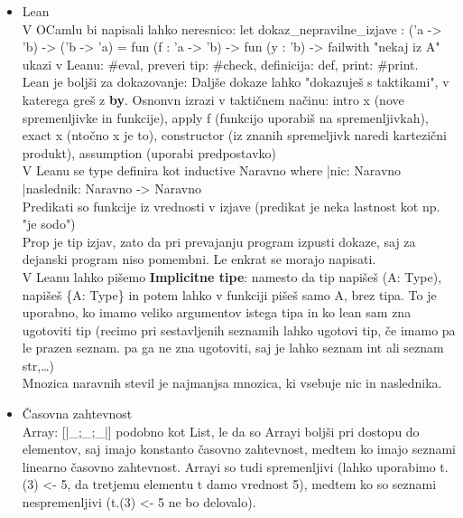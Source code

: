 \documentclass[a4paper]{article}
\begin{document}
\begin{itemize}
        Konstruktorji: nacini, kako lahko ustvarimo vrednosti danega tipa, recimo naravna stevila imajo 2 konstruktorja: Nic in Naslednik\\
        Pametni konstruktorji pa vzamejo podatke, preverijo, če so v redu in nato konstruirajo neko vrednost.\\
        failwith "Opis napake" namerno sesuje funkcijo. Uporabljamo, zato da vmo, kje je napaka v nasi kodi. Njegov tip je poljuben ('a)
        \item Lean\\
        V OCamlu bi napisali lahko neresnico: let dokaz\_nepravilne\_izjave : ('a -> 'b) -> ('b -> 'a) =
        fun (f : 'a -> 'b) -> fun (y : 'b) -> failwith "nekaj iz A"\\
        ukazi v Leanu: \#eval, preveri tip: \#check, definicija: def, print: \#print.\\
        Lean je boljši za dokazovanje: Daljše dokaze lahko "dokazuješ s taktikami", v katerega greš z \textbf{by}. Osnonvn izrazi v taktičnem načinu: intro x (nove spremenljivke in funkcije), apply f (funkcijo uporabiš na spremenljivkah), exact x (ntočno x je to), constructor (iz znanih spremeljivk naredi kartezični produkt), assumption (uporabi predpostavko)\\
        V Leanu se type definira kot inductive Naravno where |nic: Naravno |naslednik: Naravno -> Naravno\\
        Predikati so funkcije iz vrednosti v izjave (predikat je neka lastnost kot np. "je sodo")\\
        Prop je tip izjav, zato da pri prevajanju program izpusti dokaze, saj za dejanski program niso pomembni. Le enkrat se morajo napisati.\\
        V Leanu lahko pišemo \textbf{Implicitne tipe}: namesto da tip napišeš (A: Type), napišeš \{A: Type\} in potem lahko v funkciji pišeš samo A, brez tipa. To je uporabno, ko imamo veliko argumentov istega tipa in ko lean sam zna ugotoviti tip (recimo pri sestavljenih seznamih lahko ugotovi tip, če imamo pa le prazen seznam. pa ga ne zna ugotoviti, saj je lahko seznam int ali seznam str,\ldots)\\
        Mnozica naravnih stevil je najmanjsa mnozica, ki vsebuje nic in naslednika.
        \item Časovna zahtevnost\\
        Array: [|\_;\_;\_|] podobno kot List, le da so Arrayi boljši pri dostopu do elementov, saj imajo konstanto časovno zahtevnost, medtem ko imajo seznami linearno časovno zahtevnost. Arrayi so tudi spremenljivi (lahko uporabimo t.(3) <- 5, da tretjemu elementu t damo vrednost 5), medtem ko so seznami nespremenljivi (t.(3) <- 5 ne bo delovalo).\\

\end{itemize}
\end{document}
